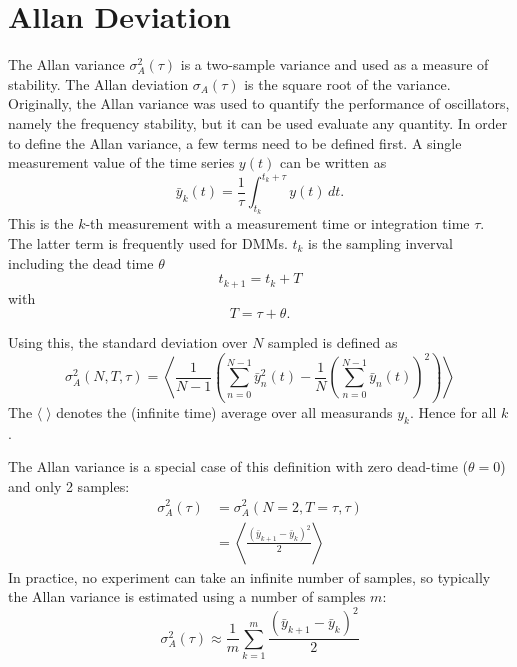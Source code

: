 \clearpage
\section{Allan Deviation}
The Allan variance \cite{adev} $\sigma_A^2(\tau)$ is a two-sample variance and used as a measure of stability. The Allan deviation $\sigma_A(\tau)$ is the square root of the variance. Originally, the Allan variance was used to quantify the performance of oscillators, namely the frequency stability, but it can be used evaluate any quantity. In order to define the Allan variance, a few terms need to be defined first. A single measurement value of the time series $y(t)$ can be written as
\begin{equation}
    \bar y_k(t) = \frac 1 \tau \int_{t_{k}}^{t_{k}+\tau} y(t)\,dt .
\end{equation}
This is the $k$-th measurement with a measurement time or integration time $\tau$. The latter term is frequently used for DMMs. $t_k$ is the sampling inverval including the dead time $\theta$
\begin{equation}
    t_{k+1} = t_k + T
\end{equation}
with
\begin{equation}
    T = \tau + \theta .
\end{equation}

Using this, the standard deviation over $N$ sampled is defined as \cite{adev,psd_to_adev}
\begin{equation}
    \sigma_A^2(N,T,\tau) = \left\langle \frac{1}{N-1} \left(\sum _{n=0}^{N-1}\bar y_n^2(t)-\frac{1}{N}\left(\sum _{n=0}^{N-1} \bar y_n(t)\right)^2\right)\right\rangle
\end{equation}
The $\langle \; \rangle$ denotes the (infinite time) average over all measurands $y_k$. Hence for all $k$.

The Allan variance is a special case of this definition with zero dead-time ($\theta=0$) and only 2 samples:
\begin{align}
    \sigma_A^2(\tau) &= \sigma_A^2(N=2,T=\tau,\tau) \label{eqn:allan_coefficients}\\
    &= \left\langle \frac{\left(\bar y_{k+1} - \bar y_k \right)^2}{2} \right\rangle
\end{align}
In practice, no experiment can take an infinite number of samples, so typically the Allan variance is estimated using a number of samples $m$:
\begin{equation}
    \sigma_A^2(\tau) \approx \frac1 m \sum_{k=1}^m \frac{\left(\bar y_{k+1} - \bar y_{k} \right)^2}{2} \label{eqn:adev_estimator}
\end{equation}

